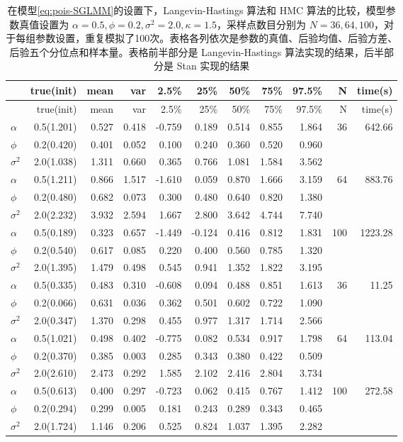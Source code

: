 \documentclass[12pt,a4paper,UTF8,twoside]{book}
\theoremstyle{definition}
\theoremstyle{definition}
\theoremstyle{definition}
\theoremstyle{remark}
\begin{document}
\begin{longtable}[]{@{}lrrrrrrrrrr@{}}
\caption{\label{tab:Pois-MCLV-vs-NUTS}
在模型\eqref{eq:pois-SGLMM}的设置下，Langevin-Hastings 算法和 HMC
算法的比较，模型参数真值设置为
\(\alpha = 0.5, \phi = 0.2, \sigma^2 = 2.0, \kappa = 1.5\)，采样点数目分别为
\(N=36,64,100\)，对于每组参数设置，重复模拟了100次。表格各列依次是参数的真值、后验均值、后验方差、后验五个分位点和样本量。表格前半部分是
Langevin-Hastings 算法实现的结果，后半部分是 Stan
实现的结果}\tabularnewline
\toprule
& true(init) & mean & var & 2.5\% & 25\% & 50\% & 75\% & 97.5\% & N &
time(s)\tabularnewline
\midrule
\endfirsthead
\toprule
& true(init) & mean & var & 2.5\% & 25\% & 50\% & 75\% & 97.5\% & N &
time(s)\tabularnewline
\midrule
\endhead
\(\alpha\) & 0.5(1.201) & 0.527 & 0.418 & -0.759 & 0.189 & 0.514 & 0.855
& 1.864 & 36 & 642.66\tabularnewline
\(\phi\) & 0.2(0.420) & 0.401 & 0.052 & 0.100 & 0.240 & 0.360 & 0.520 &
0.960 & &\tabularnewline
\(\sigma^2\) & 2.0(1.038) & 1.311 & 0.660 & 0.365 & 0.766 & 1.081 &
1.584 & 3.562 & &\tabularnewline
\(\alpha\) & 0.5(1.211) & 0.866 & 1.517 & -1.610 & 0.059 & 0.870 & 1.666
& 3.159 & 64 & 883.76\tabularnewline
\(\phi\) & 0.2(0.480) & 0.682 & 0.073 & 0.300 & 0.480 & 0.640 & 0.820 &
1.380 & &\tabularnewline
\(\sigma^2\) & 2.0(2.232) & 3.932 & 2.594 & 1.667 & 2.800 & 3.642 &
4.744 & 7.740 & &\tabularnewline
\(\alpha\) & 0.5(0.189) & 0.323 & 0.657 & -1.449 & -0.124 & 0.416 &
0.812 & 1.831 & 100 & 1223.28\tabularnewline
\(\phi\) & 0.2(0.540) & 0.617 & 0.085 & 0.220 & 0.400 & 0.560 & 0.785 &
1.320 & &\tabularnewline
\(\sigma^2\) & 2.0(1.395) & 1.479 & 0.498 & 0.545 & 0.941 & 1.352 &
1.822 & 3.195 & &\tabularnewline
\(\alpha\) & 0.5(0.335) & 0.483 & 0.310 & -0.608 & 0.094 & 0.488 & 0.851
& 1.613 & 36 & 11.25\tabularnewline
\(\phi\) & 0.2(0.066) & 0.631 & 0.036 & 0.362 & 0.501 & 0.602 & 0.722 &
1.090 & &\tabularnewline
\(\sigma^2\) & 2.0(0.347) & 1.370 & 0.298 & 0.455 & 0.977 & 1.317 &
1.714 & 2.566 & &\tabularnewline
\(\alpha\) & 0.5(1.021) & 0.498 & 0.402 & -0.775 & 0.082 & 0.534 & 0.917
& 1.798 & 64 & 113.04\tabularnewline
\(\phi\) & 0.2(0.370) & 0.385 & 0.003 & 0.285 & 0.343 & 0.380 & 0.422 &
0.509 & &\tabularnewline
\(\sigma^2\) & 2.0(2.610) & 2.473 & 0.292 & 1.585 & 2.102 & 2.416 &
2.804 & 3.734 & &\tabularnewline
\(\alpha\) & 0.5(0.613) & 0.400 & 0.297 & -0.723 & 0.062 & 0.415 & 0.767
& 1.412 & 100 & 272.58\tabularnewline
\(\phi\) & 0.2(0.294) & 0.299 & 0.005 & 0.181 & 0.243 & 0.289 & 0.343 &
0.465 & &\tabularnewline
\(\sigma^2\) & 2.0(1.724) & 1.146 & 0.206 & 0.525 & 0.824 & 1.037 &
1.395 & 2.282 & &\tabularnewline
\bottomrule
\end{longtable}
\end{document}
